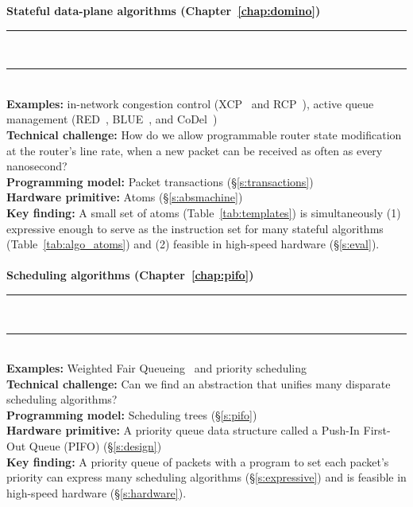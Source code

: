 \begin{table}
\textbf{Stateful data-plane algorithms (Chapter~\ref{chap:domino})}
\\[-7pt]\rule{\textwidth}{1pt}\\[-7pt]\rule{\textwidth}{1pt} \\
\textbf{Examples:} in-network congestion control (\eg XCP~\cite{xcp} and
RCP~\cite{rcp}), active queue management (\eg RED~\cite{red}, BLUE~\cite{blue},
and CoDel~\cite{codel}) \\
\textbf{Technical challenge:} How do we allow programmable router state
modification at the router's line rate, when a new packet can be received as
often as every nanosecond? \\
\textbf{Programming model:} Packet transactions (\S\ref{s:transactions})\\
\textbf{Hardware primitive:} Atoms (\S\ref{s:absmachine}) \\
\textbf{Key finding:} A small set of atoms (Table~\ref{tab:templates}) is
simultaneously (1) expressive enough to serve as the instruction set for many
stateful algorithms (Table~\ref{tab:algo_atoms}) and (2) feasible
in high-speed hardware (\S\ref{s:eval}). \\ \\

\textbf{Scheduling algorithms (Chapter~\ref{chap:pifo})}
\\[-7pt]\rule{\textwidth}{1pt}\\[-7pt]\rule{\textwidth}{1pt} \\
\textbf{Examples:} Weighted Fair Queueing~\cite{wfq} and priority scheduling~\cite{srpt} \\
\textbf{Technical challenge:} Can we find an abstraction that unifies many disparate
scheduling algorithms? \\
\textbf{Programming model:} Scheduling trees (\S\ref{s:pifo}) \\
\textbf{Hardware primitive:} A priority queue data structure called a Push-In First-Out
Queue (PIFO) (\S\ref{s:design}) \\
\textbf{Key finding:} A priority queue of packets with a program to set each
packet's priority can express many scheduling algorithms
(\S\ref{s:expressive}) and is feasible in high-speed hardware
(\S\ref{s:hardware}). \\\\


\end{table}
